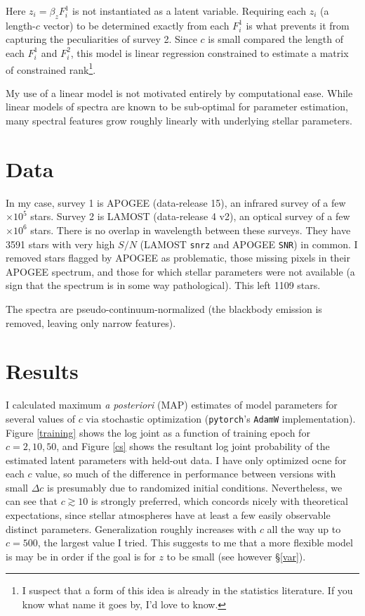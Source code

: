 \documentclass[12pt]{article}
\begin{document}
Here $z_i = \beta_z F^1_i$ is not instantiated as a latent variable.
Requiring each $z_i$ (a length-$c$ vector) to be determined exactly from each $F^1_i$ is what prevents it from capturing the peculiarities of survey 2.
Since $c$ is small compared the length of each $F^1_i$ and $F^2_i$, this model is linear regression constrained to estimate a matrix of constrained rank\footnote{I suspect that a form of this idea is already in the statistics literature.  If you know what name it goes by, I'd love to know.}.

My use of a linear model is not motivated entirely by computational ease.  
While linear models of spectra are known to be sub-optimal for parameter estimation, many spectral features grow roughly linearly with underlying stellar parameters.

\section{Data}
In my case, survey 1 is APOGEE (data-release 15), an infrared survey of a few $ \times 10^5$ stars.
Survey 2 is LAMOST (data-release 4 v2), an optical survey of a few $\times 10^6$ stars.
There is no overlap in wavelength between these surveys.
They have 3591 stars with very high $S/N$ (LAMOST \texttt{snrz} and APOGEE \texttt{SNR}) in common.
I removed stars flagged by APOGEE as problematic, those missing pixels in their APOGEE spectrum, and those for which stellar parameters were not available (a sign that the spectrum is in some way pathological).
This left 1109 stars.

The spectra are pseudo-continuum-normalized (the blackbody emission is removed, leaving only narrow features).

\section{Results}
I calculated maximum \emph{a posteriori} (MAP) estimates of model parameters for several values of $c$ via stochastic optimization (\texttt{pytorch}'s \texttt{AdamW} implementation).
Figure \ref{training} shows the log joint as a function of training epoch for $c=2, 10, 50$, and Figure \ref{cs} shows the resultant log joint probability of the estimated latent parameters with held-out data.
I have only optimized ocne for each $c$ value, so much of the difference in performance between versions with small $\Delta c$ is presumably due to randomized initial conditions.
Nevertheless, we can see that $c \gtrsim 10$ is strongly preferred, which concords nicely with theoretical expectations, since stellar atmospheres have at least a few easily observable distinct parameters.
Generalization roughly increases with $c$ all the way up to $c=500$, the largest value I tried.  This suggests to me that a more flexible model is may be in order if the goal is for $z$ to be small (see however \S \ref{var}).
\end{document}
